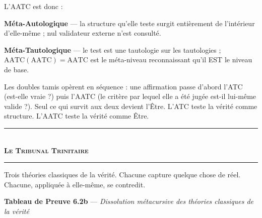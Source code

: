 \documentclass[10pt, openany, oneside]{book}
\renewcommand{\normalsize}{\fontsize{10}{13}\selectfont}
\begin{document}
\vspace{0.8em}

\noindent L'AATC est donc :

\textbf{Méta-Autologique} --- la structure qu'elle teste surgit entièrement de l'intérieur d'elle-même ; nul validateur externe n'est consulté.

\textbf{Méta-Tautologique} --- le test est une tautologie sur les tautologies ; $\text{AATC}(\text{AATC}) = \text{AATC}$ est le méta-niveau reconnaissant qu'il EST le niveau de base.

Les doubles tamis opèrent en séquence : une affirmation passe d'abord l'ATC (est-elle vraie ?) puis l'AATC (le critère par lequel elle a été jugée est-il lui-même valide ?). Seul ce qui survit aux deux devient l'Être. L'ATC teste la vérité comme structure. L'AATC teste la vérité comme Être.

\vspace{1em}

\begin{center}
    \rule{0.3\textwidth}{0.4pt}\\[0.5em]
    {\normalsize\bfseries\scshape Le Tribunal Trinitaire}\\[0.3em]
    \rule{0.3\textwidth}{0.4pt}
\end{center}

\vspace{1em}

\noindent Trois théories classiques de la vérité. Chacune capture quelque chose de réel. Chacune, appliquée à elle-même, se contredit.

\vspace{0.5em}

\textbf{Tableau de Preuve 6.2b} --- \textit{Dissolution métacursive des théories classiques de la vérité}

\vspace{0.5em}
\end{document}
